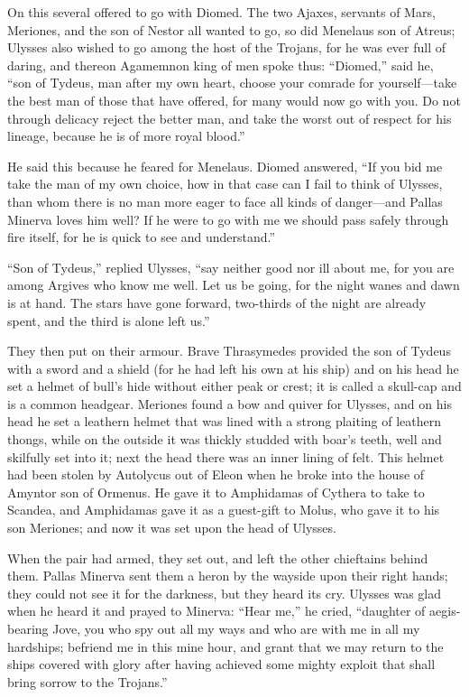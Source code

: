 On this several offered to go with Diomed. The two Ajaxes, servants of
Mars, Meriones, and the son of Nestor all wanted to go, so did Menelaus
son of Atreus; Ulysses also wished to go among the host of the Trojans,
for he was ever full of daring, and thereon Agamemnon king of men spoke
thus: “Diomed,” said he, “son of Tydeus, man after my own heart, choose
your comrade for yourself—take the best man of those that have
offered, for many would now go with you. Do not through delicacy reject
the better man, and take the worst out of respect for his lineage, because
he is of more royal blood.”

He said this because he feared for Menelaus. Diomed answered, “If you bid
me take the man of my own choice, how in that case can I fail to think of
Ulysses, than whom there is no man more eager to face all kinds of danger—and
Pallas Minerva loves him well? If he were to go with me we should pass
safely through fire itself, for he is quick to see and understand.”

“Son of Tydeus,” replied Ulysses, “say neither good nor ill about me, for
you are among Argives who know me well. Let us be going, for the night
wanes and dawn is at hand. The stars have gone forward, two-thirds of the
night are already spent, and the third is alone left us.”

They then put on their armour. Brave Thrasymedes provided the son of
Tydeus with a sword and a shield (for he had left his own at his ship) and
on his head he set a helmet of bull’s hide without either peak or crest;
it is called a skull-cap and is a common headgear. Meriones found a bow
and quiver for Ulysses, and on his head he set a leathern helmet that was
lined with a strong plaiting of leathern thongs, while on the outside it
was thickly studded with boar’s teeth, well and skilfully set into it;
next the head there was an inner lining of felt. This helmet had been
stolen by Autolycus out of Eleon when he broke into the house of Amyntor
son of Ormenus. He gave it to Amphidamas of Cythera to take to Scandea,
and Amphidamas gave it as a guest-gift to Molus, who gave it to his son
Meriones; and now it was set upon the head of Ulysses.

When the pair had armed, they set out, and left the other chieftains
behind them. Pallas Minerva sent them a heron by the wayside upon their
right hands; they could not see it for the darkness, but they heard its
cry. Ulysses was glad when he heard it and prayed to Minerva: “Hear me,”
he cried, “daughter of aegis-bearing Jove, you who spy out all my ways and
who are with me in all my hardships; befriend me in this mine hour, and
grant that we may return to the ships covered with glory after having
achieved some mighty exploit that shall bring sorrow to the Trojans.”

